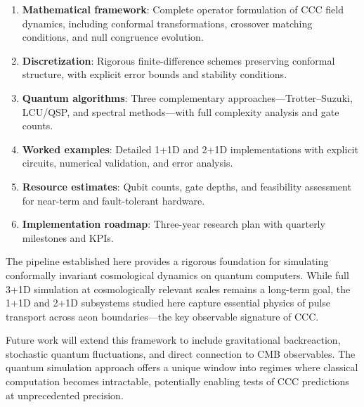 \documentclass[11pt,a4paper]{article}
\theoremstyle{plain}
\theoremstyle{definition}
\theoremstyle{remark}
\begin{document}
\begin{enumerate}
    \item \textbf{Mathematical framework}: Complete operator formulation of CCC field dynamics, including conformal transformations, crossover matching conditions, and null congruence evolution.
    
    \item \textbf{Discretization}: Rigorous finite-difference schemes preserving conformal structure, with explicit error bounds and stability conditions.
    
    \item \textbf{Quantum algorithms}: Three complementary approaches---Trotter--Suzuki, LCU/QSP, and spectral methods---with full complexity analysis and gate counts.
    
    \item \textbf{Worked examples}: Detailed 1+1D and 2+1D implementations with explicit circuits, numerical validation, and error analysis.
    
    \item \textbf{Resource estimates}: Qubit counts, gate depths, and feasibility assessment for near-term and fault-tolerant hardware.
    
    \item \textbf{Implementation roadmap}: Three-year research plan with quarterly milestones and KPIs.
\end{enumerate}

The pipeline established here provides a rigorous foundation for simulating conformally invariant cosmological dynamics on quantum computers. While full 3+1D simulation at cosmologically relevant scales remains a long-term goal, the 1+1D and 2+1D subsystems studied here capture essential physics of pulse transport across aeon boundaries---the key observable signature of CCC.

Future work will extend this framework to include gravitational backreaction, stochastic quantum fluctuations, and direct connection to CMB observables. The quantum simulation approach offers a unique window into regimes where classical computation becomes intractable, potentially enabling tests of CCC predictions at unprecedented precision.

\newpage
\printbibliography[title={References}]

\appendix
\end{document}
